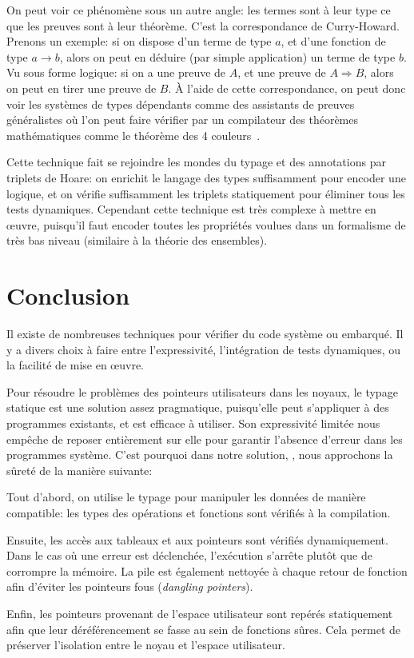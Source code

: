 On peut voir ce phénomène sous un autre angle: les termes sont à leur type ce
que les preuves sont à leur théorème. C'est la correspondance de Curry-Howard.
Prenons un exemple: si on dispose d'un terme de type $a$, et d'une fonction de
type $a → b$, alors on peut en déduire (par simple application) un terme de type
$b$. Vu sous forme logique: si on a une preuve de $A$, et une preuve de $A ⇒
B$, alors on peut en tirer une preuve de $B$. À l'aide de cette correspondance,
on peut donc voir les systèmes de types dépendants comme des assistants de
preuves généralistes où l'on peut faire vérifier par un compilateur des
théorèmes mathématiques comme le théorème des 4 couleurs~\cite{4colproof}.

Cette technique fait se rejoindre les mondes du typage et des annotations par
triplets de Hoare: on enrichit le langage des types suffisamment pour encoder
une logique, et on vérifie suffisamment les triplets statiquement pour éliminer
tous les tests dynamiques. Cependant cette technique est très complexe à mettre
en œuvre, puisqu'il faut encoder toutes les propriétés voulues dans un
formalisme de très bas niveau (similaire à la théorie des ensembles).

\section*{Conclusion}

Il existe de nombreuses techniques pour vérifier du code système ou embarqué. Il
y a divers choix à faire entre l'expressivité, l'intégration de tests
dynamiques, ou la facilité de mise en œuvre.

Pour résoudre le problèmes des pointeurs utilisateurs dans les noyaux, le typage
statique est une solution assez pragmatique, puisqu'elle peut s'appliquer à des
programmes existants, et est efficace à utiliser. Son expressivité limitée nous
empêche de reposer entièrement sur elle pour garantir l'absence d'erreur dans
les programmes système. C'est pourquoi dans notre solution, \langname, nous
approchons la sûreté de la manière suivante:

Tout d'abord, on utilise le typage pour manipuler les données de manière
compatible: les types des opérations et fonctions sont vérifiés à la
compilation.

Ensuite, les accès aux tableaux et aux pointeurs sont vérifiés dynamiquement.
Dans le cas où une erreur est déclenchée, l'exécution s'arrête plutôt que de
corrompre la mémoire. La pile est également nettoyée à chaque retour de fonction
afin d'éviter les pointeurs fous (\emph{dangling pointers}).

Enfin, les pointeurs provenant de l'espace utilisateur sont repérés statiquement
afin que leur déréférencement se fasse au sein de fonctions sûres. Cela permet
de préserver l'isolation entre le noyau et l'espace utilisateur.

